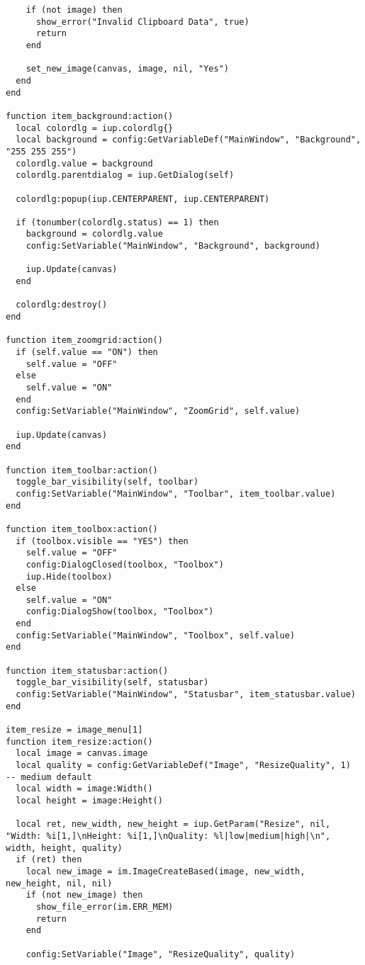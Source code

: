 \documentclass{ctexart}
\begin{document}
\begin{lstlisting}
    if (not image) then
      show_error("Invalid Clipboard Data", true)
      return
    end

    set_new_image(canvas, image, nil, "Yes")
  end
end

function item_background:action()
  local colordlg = iup.colordlg{}
  local background = config:GetVariableDef("MainWindow", "Background", "255 255 255")
  colordlg.value = background
  colordlg.parentdialog = iup.GetDialog(self)

  colordlg:popup(iup.CENTERPARENT, iup.CENTERPARENT)

  if (tonumber(colordlg.status) == 1) then
    background = colordlg.value
    config:SetVariable("MainWindow", "Background", background)

    iup.Update(canvas)
  end

  colordlg:destroy()
end

function item_zoomgrid:action()
  if (self.value == "ON") then
    self.value = "OFF"
  else
    self.value = "ON"
  end
  config:SetVariable("MainWindow", "ZoomGrid", self.value)

  iup.Update(canvas)
end

function item_toolbar:action()
  toggle_bar_visibility(self, toolbar)
  config:SetVariable("MainWindow", "Toolbar", item_toolbar.value)
end

function item_toolbox:action()
  if (toolbox.visible == "YES") then
    self.value = "OFF"
    config:DialogClosed(toolbox, "Toolbox")
    iup.Hide(toolbox)
  else
    self.value = "ON"
    config:DialogShow(toolbox, "Toolbox")
  end
  config:SetVariable("MainWindow", "Toolbox", self.value)
end

function item_statusbar:action()
  toggle_bar_visibility(self, statusbar)
  config:SetVariable("MainWindow", "Statusbar", item_statusbar.value)
end

item_resize = image_menu[1]
function item_resize:action()
  local image = canvas.image
  local quality = config:GetVariableDef("Image", "ResizeQuality", 1)  -- medium default
  local width = image:Width()
  local height = image:Height()

  local ret, new_width, new_height = iup.GetParam("Resize", nil, "Width: %i[1,]\nHeight: %i[1,]\nQuality: %l|low|medium|high|\n", width, height, quality)
  if (ret) then
    local new_image = im.ImageCreateBased(image, new_width, new_height, nil, nil)
    if (not new_image) then
      show_file_error(im.ERR_MEM)
      return 
    end

    config:SetVariable("Image", "ResizeQuality", quality)


\end{lstlisting}
\end{document}
